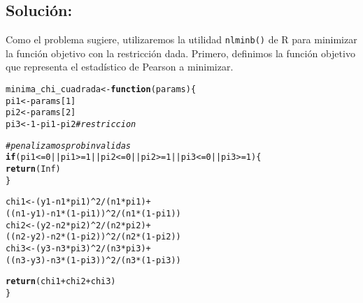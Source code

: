 \documentclass[paper=letter, fontsize=11pt]{scrartcl}\usepackage[]{graphicx}\usepackage[]{xcolor}
\makeatletter
\newcommand{\hlnum}[1]{\textcolor[rgb]{0.686,0.059,0.569}{#1}}%
\newcommand{\hlcom}[1]{\textcolor[rgb]{0.678,0.584,0.686}{\textit{#1}}}%
\newcommand{\hlopt}[1]{\textcolor[rgb]{0,0,0}{#1}}%
\newcommand{\hldef}[1]{\textcolor[rgb]{0.345,0.345,0.345}{#1}}%
\newcommand{\hlkwa}[1]{\textcolor[rgb]{0.161,0.373,0.58}{\textbf{#1}}}%
\newcommand{\hlkwb}[1]{\textcolor[rgb]{0.69,0.353,0.396}{#1}}%
\newcommand{\hlkwc}[1]{\textcolor[rgb]{0.333,0.667,0.333}{#1}}%
\newcommand{\hlkwd}[1]{\textcolor[rgb]{0.737,0.353,0.396}{\textbf{#1}}}%
\newenvironment{kframe}{%
 \def\at@end@of@kframe{}%
 \ifinner\ifhmode%
  \def\at@end@of@kframe{\end{minipage}}%
  \begin{minipage}{\columnwidth}%
 \fi\fi%
 \def\FrameCommand##1{\hskip\@totalleftmargin \hskip-\fboxsep
 \colorbox{shadecolor}{##1}\hskip-\fboxsep
     \hskip-\linewidth \hskip-\@totalleftmargin \hskip\columnwidth}%
 \MakeFramed {\advance\hsize-\width
   \@totalleftmargin\z@ \linewidth\hsize
   \@setminipage}}%
 {\par\unskip\endMakeFramed%
 \at@end@of@kframe}
\newenvironment{knitrout}{}{} %
\numberwithin{equation}{problemcounter} %
\numberwithin{figure}{problemcounter} %
\numberwithin{table}{problemcounter} %
\numberwithin{subsection}{problemcounter}
\makeatother
\begin{document}
\subsection{\textbf{Solución:}}

Como el problema sugiere, utilizaremos la utilidad \texttt{nlminb()} de R para minimizar la función objetivo con la restricción dada. Primero, definimos la función objetivo que representa el estadístico de Pearson a minimizar.


\begin{knitrout}
\color{fgcolor}\begin{kframe}
\begin{alltt}
\hldef{minima_chi_cuadrada} \hlkwb{<-} \hlkwa{function}\hldef{(}\hlkwc{params}\hldef{) \{}
  \hldef{pi1} \hlkwb{<-} \hldef{params[}\hlnum{1}\hldef{]}
  \hldef{pi2} \hlkwb{<-} \hldef{params[}\hlnum{2}\hldef{]}
  \hldef{pi3} \hlkwb{<-} \hlnum{1} \hlopt{-} \hldef{pi1} \hlopt{-} \hldef{pi2} \hlcom{# restriccion}

  \hlcom{# penalizamos prob invalidas}
  \hlkwa{if} \hldef{(pi1} \hlopt{<=} \hlnum{0} \hlopt{||} \hldef{pi1} \hlopt{>=} \hlnum{1} \hlopt{||} \hldef{pi2} \hlopt{<=} \hlnum{0} \hlopt{||} \hldef{pi2} \hlopt{>=} \hlnum{1} \hlopt{||} \hldef{pi3} \hlopt{<=} \hlnum{0} \hlopt{||} \hldef{pi3} \hlopt{>=} \hlnum{1}\hldef{) \{}
    \hlkwd{return}\hldef{(}\hlnum{Inf}\hldef{)}
  \hldef{\}}

  \hldef{chi1} \hlkwb{<-} \hldef{(y1} \hlopt{-} \hldef{n1} \hlopt{*} \hldef{pi1)}\hlopt{^}\hlnum{2} \hlopt{/} \hldef{(n1} \hlopt{*} \hldef{pi1)} \hlopt{+}
          \hldef{((n1}\hlopt{-}\hldef{y1)} \hlopt{-} \hldef{n1}\hlopt{*}\hldef{(}\hlnum{1}\hlopt{-}\hldef{pi1))}\hlopt{^}\hlnum{2} \hlopt{/} \hldef{(n1} \hlopt{*} \hldef{(}\hlnum{1} \hlopt{-} \hldef{pi1))}
  \hldef{chi2} \hlkwb{<-} \hldef{(y2} \hlopt{-} \hldef{n2} \hlopt{*} \hldef{pi2)}\hlopt{^}\hlnum{2} \hlopt{/} \hldef{(n2} \hlopt{*} \hldef{pi2)} \hlopt{+}
          \hldef{((n2}\hlopt{-}\hldef{y2)} \hlopt{-} \hldef{n2}\hlopt{*}\hldef{(}\hlnum{1}\hlopt{-}\hldef{pi2))}\hlopt{^}\hlnum{2} \hlopt{/} \hldef{(n2} \hlopt{*} \hldef{(}\hlnum{1} \hlopt{-} \hldef{pi2))}
  \hldef{chi3} \hlkwb{<-} \hldef{(y3} \hlopt{-} \hldef{n3} \hlopt{*} \hldef{pi3)}\hlopt{^}\hlnum{2} \hlopt{/} \hldef{(n3} \hlopt{*} \hldef{pi3)} \hlopt{+}
          \hldef{((n3}\hlopt{-}\hldef{y3)} \hlopt{-} \hldef{n3}\hlopt{*}\hldef{(}\hlnum{1}\hlopt{-}\hldef{pi3))}\hlopt{^}\hlnum{2} \hlopt{/} \hldef{(n3} \hlopt{*} \hldef{(}\hlnum{1} \hlopt{-} \hldef{pi3))}

  \hlkwd{return}\hldef{(chi1} \hlopt{+} \hldef{chi2} \hlopt{+} \hldef{chi3)}
\hldef{\}}
\end{alltt}
\end{kframe}
\end{knitrout}
\end{document}
